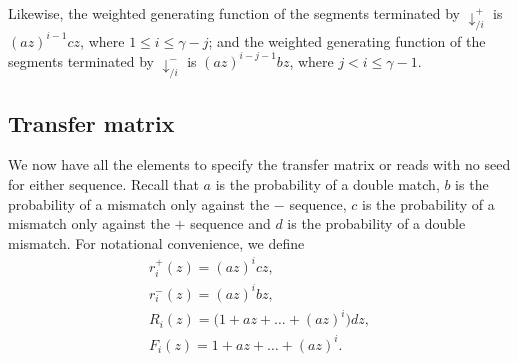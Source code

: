 \documentclass{article}
\begin{document}
Likewise, the weighted generating function of the segments terminated by
$\downarrow_{/i}^+$ is $(az)^{i-1}cz$, where $1 \leq i \leq \gamma-j$; and
the weighted generating function of the segments terminated by
$\downarrow_{/i}^-$ is $(az)^{i-j-1}bz$, where $j < i \leq \gamma-1$.

\subsection{Transfer matrix}

We now have all the elements to specify the transfer matrix or reads with
no seed for either sequence. Recall that $a$ is the probability of a
double match, $b$ is the probability of a mismatch only against the $-$
sequence, $c$ is the probability of a mismatch only against the $+$
sequence and $d$ is the probability of a double mismatch. For notational
convenience, we define
\begin{equation}
\begin{gathered}
r_i^+(z) = (az)^i cz, \\
r_i^-(z) = (az)^i bz, \\
R_i(z) = \big( 1 + az + \ldots + (az)^i \big) dz, \\
F_i(z) = 1 + az + \ldots + (az)^i.
\end{gathered}
\end{equation}
\end{document}
